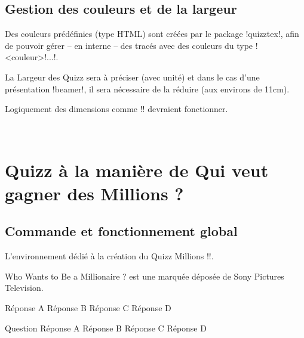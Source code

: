 \documentclass[french,a4paper,11pt]{article}
\begin{document}
\subsection{Gestion des couleurs et de la largeur}

\begin{tipblock}
Des couleurs prédéfinies (type \textsf{HTML}) sont créées par le package \packagetex!quizztex!, afin de pouvoir gérer -- en interne -- des tracés avec des couleurs du type \motcletex!<couleur>!...!.
\end{tipblock}

\begin{tipblock}
La Largeur des Quizz sera à préciser (avec unité) et dans le cas d'une présentation \packagetex!beamer!, il sera nécessaire de la réduire (aux environs de 11cm).

Logiquement des dimensions comme \motcletex!\linewidth! devraient fonctionner.
\end{tipblock}

\vfill~

\pagebreak

\section{Quizz à la manière de \og Qui veut gagner des Millions ? \fg}

\subsection{Commande et fonctionnement global}

\begin{cautionblock}
L'environnement dédié à la création du Quizz \og Millions \fg{} \motcletex!\QuizzMillions!.

\smallskip

\textsf{Who Wants to Be a Millionaire ?\texttrademark} est une marquée déposée de Sony Pictures Television.
\end{cautionblock}

\begin{DemoCode}
	{Réponse A}
	{Réponse B}
	{Réponse C}
	{Réponse D}
\end{DemoCode}

\begin{DemoCode}
\QuizzMillions
	{Question}
	{Réponse A}
	{Réponse B}
	{Réponse C}
	{Réponse D}
\end{DemoCode}
\end{document}
